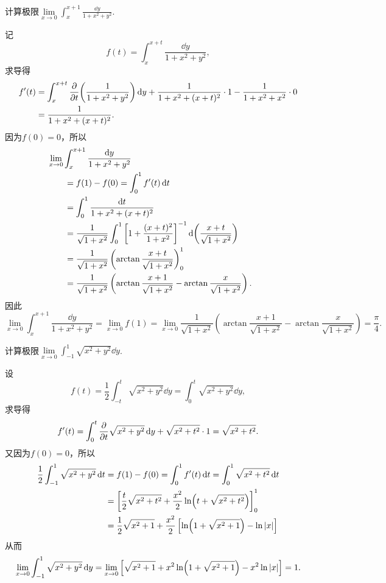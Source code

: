 \begin{example}%
\def\l{\lim\limits_{x\to0}}%
计算极限\(\l \int_x^{x+1} \frac{\dd{y}}{1+x^2+y^2}\).
\begin{solution}
记\[
f(t) = \int_x^{x+t} \frac{\dd{y}}{1+x^2+y^2},
\]求导得\begin{align*}
f'(t)
&= \int_x^{x+t} \pdv{t}(\frac{1}{1+x^2+y^2}) \dd{y}
+ \frac{1}{1+x^2+(x+t)^2} \cdot 1
- \frac{1}{1+x^2+x^2} \cdot 0 \\
&= \frac{1}{1+x^2+(x+t)^2}.
\end{align*}
因为\(f(0) = 0\)，所以
\begin{align*}
&\hspace{-20pt}
\l \int_x^{x+1} \frac{\dd{y}}{1+x^2+y^2} \\
&= f(1) - f(0)
= \int_0^1 f'(t) \dd{t} \\
&= \int_0^1 \frac{\dd{t}}{1+x^2+(x+t)^2} \\
&= \frac{1}{\sqrt{1+x^2}} \int_0^1 \left[1+\frac{(x+t)^2}{1+x^2}\right]^{-1} \dd(\frac{x+t}{\sqrt{1+x^2}}) \\
&= \frac{1}{\sqrt{1+x^2}} \left(\arctan\frac{x+t}{\sqrt{1+x^2}}\right)_0^1 \\
&= \frac{1}{\sqrt{1+x^2}} \left(
\arctan\frac{x+1}{\sqrt{1+x^2}}
- \arctan\frac{x}{\sqrt{1+x^2}}
\right).
\end{align*}
因此\[
\l \int_x^{x+1} \frac{\dd{y}}{1+x^2+y^2}
= \l f(1)
= \l \frac{1}{\sqrt{1+x^2}} \left(
\arctan\frac{x+1}{\sqrt{1+x^2}}
- \arctan\frac{x}{\sqrt{1+x^2}}
\right)
= \frac{\pi}{4}.
\]
\end{solution}
\end{example}

\begin{example}%
\def\l{\lim\limits_{x\to0}}%
计算极限\(\l \int_{-1}^1 \sqrt{x^2+y^2} \dd{y}\).
\begin{solution}
设\[
f(t)
=\frac{1}{2} \int_{-t}^t \sqrt{x^2+y^2} \dd{y}
=\int_0^t \sqrt{x^2+y^2} \dd{y},
\]
求导得\[
f'(t)
= \int_0^t \pdv{t} \sqrt{x^2+y^2} \dd{y}
	+ \sqrt{x^2+t^2} \cdot 1
= \sqrt{x^2+t^2}.
\]又因为\(f(0) = 0\)，所以\begin{align*}
\frac{1}{2} \int_{-1}^1 \sqrt{x^2+y^2} \dd{t}
&=f(1) - f(0)
= \int_0^1 f'(t) \dd{t}
= \int_0^1 \sqrt{x^2+t^2} \dd{t} \\
&= \left[
\frac{t}{2} \sqrt{x^2+t^2} + \frac{x^2}{2} \ln(t+\sqrt{x^2+t^2})
\right]_0^1 \\
&= \frac{1}{2} \sqrt{x^2+1} + \frac{x^2}{2} \left[ \ln(1+\sqrt{x^2+1}) - \ln\abs{x} \right]
\end{align*}
从而\[
\l \int_{-1}^1 \sqrt{x^2+y^2} \dd{y}
= \l \left[
\sqrt{x^2+1}
+ x^2 \ln(1+\sqrt{x^2+1}) - x^2 \ln\abs{x}
\right]
= 1.
\]
\end{solution}
\end{example}


